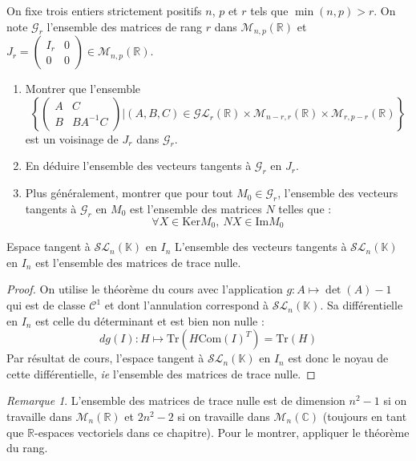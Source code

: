 \documentclass[french,a4paper]{article}
\newcommand{\R}{\mathbb{R}}
\newcommand{\C}{\mathbb{C}}
\newcommand{\K}{\mathbb{K}}
\newcommand{\inv}{^{-1}}
\renewcommand{\ker}{\text{Ker}}
\newcommand{\Tr}{\text{Tr}}
\theoremstyle{plain}
\theoremstyle{definition}
\theoremstyle{remark}
\newtheorem*{rmq}{Remarque}
\begin{document}
\begin{ex}[Moulin.65]{}
	On fixe trois entiers strictement positifs $n$, $p$ et $r$ tels que $\min(n,p)>r$. On note $\mathcal{G}_r$ l'ensemble des matrices de rang $r$ dans $\mathcal{M}_{n,p}(\R)$ et $J_r=\displaystyle\begin{pmatrix}
		I_r&0\\
		0&0
	\end{pmatrix}\in\mathcal{M}_{n,p}(\R)$.
	\begin{enumerate}
		\item Montrer que l'ensemble $$\left\{\begin{pmatrix}
			A&C\\
			B&BA\inv C
		\end{pmatrix}\bigg| (A,B,C)\in\mathcal{GL}_r(\R)\times\mathcal{M}_{n-r,r}(\R)\times\mathcal{M}_{r,p-r}(\R)\right\}$$ est un voisinage de $J_r$ dans $\mathcal{G}_r$.
		\item En déduire l'ensemble des vecteurs tangents à $\mathcal{G}_r$ en $J_r$.
		\item Plus généralement, montrer que pour tout $M_0\in\mathcal{G}_r$, l'ensemble des vecteurs tangents à $\mathcal{G}_r$ en $M_0$ est l'ensemble des matrices $N$ telles que : $$\forall X\in\ker M_0,\ NX\in\text{Im}M_0$$
	\end{enumerate}
\end{ex}

\begin{ex}[Moulin.66]{Espace tangent à $\mathcal{SL}_n(\K)$ en $I_n$}
	L'ensemble des vecteurs tangents à $\mathcal{SL}_n(\K)$ en $I_n$ est l'ensemble des matrices de trace nulle.
\end{ex}
\begin{proof}
	On utilise le théorème du cours avec l'application $g:A\mapsto\det(A)-1$ qui est de classe $\mathcal{C}^1$ et dont l'annulation correspond à $\mathcal{SL}_n(\K)$. Sa différentielle en $I_n$ est celle du déterminant et est bien non nulle : $$dg(I):H\mapsto\Tr(H\text{Com}(I)^T)=\Tr(H)$$ Par résultat de cours, l'espace tangent à $\mathcal{SL}_n(\K)$ en $I_n$ est donc le noyau de cette différentielle, \textit{ie} l'ensemble des matrices de trace nulle.
\end{proof}
\begin{rmq}
	L'ensemble des matrices de trace nulle est de dimension $n^2-1$ si on travaille dans $\mathcal{M}_n(\R)$ et $2n^2-2$ si on travaille dans $\mathcal{M}_n(\C)$ (toujours en tant que $\R$-espaces vectoriels dans ce chapitre). Pour le montrer, appliquer le théorème du rang.
\end{rmq}
\end{document}
